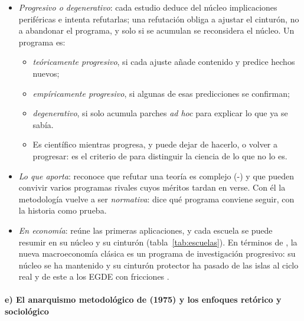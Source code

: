 \documentclass[11pt]{article}
\begin{document}
\begin{itemize}
\item \emph{Progresivo o degenerativo}: cada estudio deduce del núcleo implicaciones periféricas e intenta refutarlas; una refutación obliga a ajustar el cinturón, no a abandonar el programa, y solo si se acumulan se reconsidera el núcleo. Un programa es:
  \begin{itemize}
  \item \emph{teóricamente progresivo}, si cada ajuste añade contenido y predice hechos nuevos;
  \item \emph{empíricamente progresivo}, si algunas de esas predicciones se confirman;
  \item \emph{degenerativo}, si solo acumula parches \emph{ad hoc} para explicar lo que ya se sabía.
  \end{itemize}
  \begin{itemize}
  \item Es científico mientras progresa, y puede dejar de hacerlo, o volver a progresar: es el criterio de  para distinguir la ciencia de lo que no lo es.
  \end{itemize}
\item \emph{Lo que aporta}: reconoce que refutar una teoría es complejo (-) y que pueden convivir varios programas rivales cuyos méritos tardan en verse. Con él la metodología vuelve a ser \emph{normativa}: dice qué programa conviene seguir, con la historia como prueba.
\item \emph{En economía}: \textcite{Latsis1976Method} reúne las primeras aplicaciones, y cada escuela se puede resumir en su núcleo y su cinturón (tabla~\ref{tab:escuelas}). En términos de \textcite{Lakatos1970Falsification}, la nueva macroeconomía clásica es un programa de investigación progresivo: su núcleo se ha mantenido y su cinturón protector ha pasado de las islas al ciclo real y de este a los EGDE con fricciones .
\end{itemize}

\paragraph{e) El anarquismo metodológico de  (1975) y los enfoques retórico y sociológico}
\end{document}
